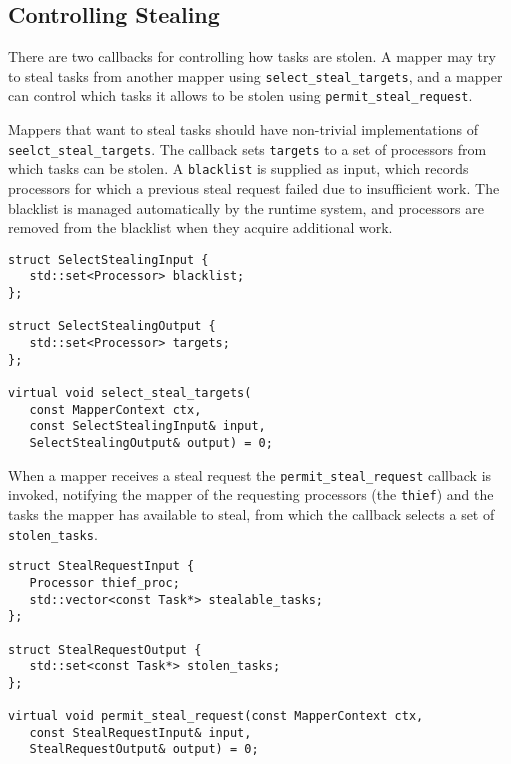 \subsection{Controlling Stealing}
\label{subsec:mapping:stealing}

There are two callbacks for controlling how tasks are stolen.  A mapper may try to steal tasks from another mapper using {\tt select\_steal\_targets}, and a mapper can control which tasks it allows to be stolen using {\tt permit\_steal\_request}.

Mappers that want to steal tasks should have non-trivial implementations of {\tt seelct\_steal\_targets}.  The callback sets
{\tt targets} to a set of processors from which tasks can be stolen.  A {\tt blacklist} is supplied as input, which records processors
for which a previous steal request failed due to insufficient work.  The blacklist is managed automatically by the runtime system, and
processors are removed from the blacklist when they acquire additional work.
\begin{lstlisting}
struct SelectStealingInput {
   std::set<Processor> blacklist;
};

struct SelectStealingOutput {
   std::set<Processor> targets;
};

virtual void select_steal_targets(
   const MapperContext ctx,
   const SelectStealingInput& input,
   SelectStealingOutput& output) = 0;
\end{lstlisting}

When a mapper receives a steal request the {\tt permit\_steal\_request} callback is invoked, notifying the mapper of the requesting
processors (the {\tt thief}) and the tasks the mapper has available to steal, from which the callback selects a set of {\tt stolen\_tasks}.
\begin{lstlisting}
struct StealRequestInput {
   Processor thief_proc;
   std::vector<const Task*> stealable_tasks;
};

struct StealRequestOutput {
   std::set<const Task*> stolen_tasks;
};

virtual void permit_steal_request(const MapperContext ctx,
   const StealRequestInput& input,
   StealRequestOutput& output) = 0;
\end{lstlisting}


